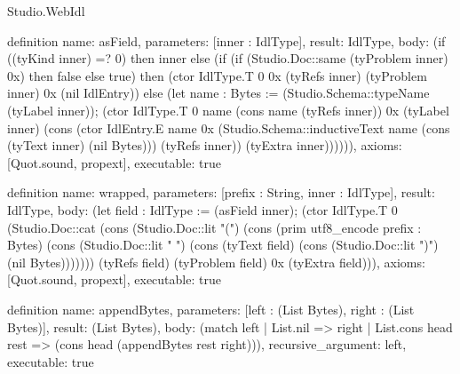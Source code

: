 \begin{lexlean}{Studio.WebIdl}
\begin{semanticmodule}
definition{
  name: asField,
  parameters: [inner : IdlType],
  result: IdlType,
  body: (if ((tyKind inner) =? 0) then inner else (if (if (Studio.Doc::same (tyProblem inner) 0x) then false else true) then (ctor IdlType.T 0 0x (tyRefs inner) (tyProblem inner) 0x (nil IdlEntry)) else (let name : Bytes := (Studio.Schema::typeName (tyLabel inner)); (ctor IdlType.T 0 name (cons name (tyRefs inner)) 0x (tyLabel inner) (cons (ctor IdlEntry.E name 0x (Studio.Schema::inductiveText name (cons (tyText inner) (nil Bytes))) (tyRefs inner)) (tyExtra inner)))))),
  axioms: [Quot.sound, propext],
  executable: true
}

definition{
  name: wrapped,
  parameters: [prefix : String, inner : IdlType],
  result: IdlType,
  body: (let field : IdlType := (asField inner); (ctor IdlType.T 0 (Studio.Doc::cat (cons (Studio.Doc::lit "(") (cons (prim utf8_encode prefix : Bytes) (cons (Studio.Doc::lit " ") (cons (tyText field) (cons (Studio.Doc::lit ")") (nil Bytes))))))) (tyRefs field) (tyProblem field) 0x (tyExtra field))),
  axioms: [Quot.sound, propext],
  executable: true
}

definition{
  name: appendBytes,
  parameters: [left : (List Bytes), right : (List Bytes)],
  result: (List Bytes),
  body: (match left
    | List.nil => right
    | List.cons head rest => (cons head (appendBytes rest right))),
  recursive_argument: left,
  executable: true
}


\end{semanticmodule}
\end{lexlean}

